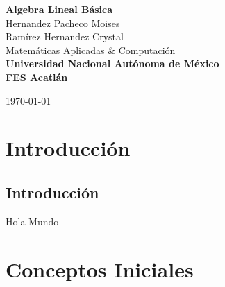 \documentclass[a4paper,12pt]{report} %
\begin{document}
\begin{titlepage}
    \pagecolor{MidnightBlue}
    \color{white}
    \centering
    {\Huge \textbf{Algebra Lineal Básica}} \\[2.5cm] %
    {\Large Hernandez Pacheco Moises} \\[0.5cm]       %
    {\Large Ramírez Hernandez Crystal} \\[6cm]       %
    \color{SkyBlue}
    {\Large Matemáticas Aplicadas \& Computación} \\[1cm]
    \color{white}
    \textbf{\large Universidad Nacional Autónoma de México} \\[0.5cm]   %
    \textbf{\large FES Acatlán} \\[1cm]   %
    \vfill
    
    \vfill
    {\large \today}                              %
\end{titlepage}

\restoregeometry %

\pagecolor{white}
\color{black}
\hypertarget{toc}{} %
\tableofcontents %

\newpage
\renewcommand{\thechapter}{\Roman{chapter}}
\part{Introducción}
\renewcommand{\thechapter}{\arabic{chapter}}
\chapter{Introducción}
Hola Mundo

\newpage
\renewcommand{\thechapter}{\Roman{chapter}}
\part{Conceptos Iniciales}
\renewcommand{\thechapter}{\arabic{chapter}}
\end{document}
